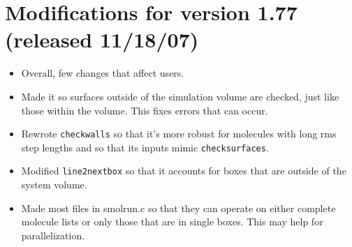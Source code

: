 \documentclass {scrbook}
\newcommand {\ttt} {\texttt}
\begin{document}
\section{Modifications for version 1.77 (released 11/18/07)}
\begin{itemize}
\item Overall, few changes that affect users.
\item Made it so surfaces outside of the simulation volume are checked, just like those within the volume. This fixes errors that can occur.
\item Rewrote \ttt{checkwalls} so that it's more robust for molecules with long rms step lengths and so that its inputs mimic \ttt{checksurfaces}.
\item Modified \ttt{line2nextbox} so that it accounts for boxes that are outside of the system volume.
\item Made most files in smolrun.c so that they can operate on either complete molecule lists or only those that are in single boxes. This may help for parallelization.
\end{itemize}
\end{document}
